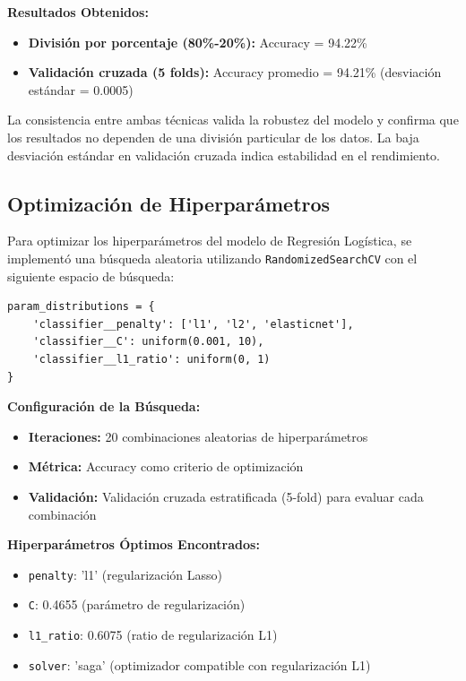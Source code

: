 \documentclass{article}
\begin{document}
\textbf{Resultados Obtenidos:}
\begin{itemize}
    \item \textbf{División por porcentaje (80\%-20\%):} Accuracy = 94.22\%
    \item \textbf{Validación cruzada (5 folds):} Accuracy promedio = 94.21\% (desviación estándar = 0.0005)
\end{itemize}

La consistencia entre ambas técnicas valida la robustez del modelo y confirma que los resultados no dependen de una división particular de los datos. La baja desviación estándar en validación cruzada indica estabilidad en el rendimiento.

\subsection{Optimización de Hiperparámetros}

Para optimizar los hiperparámetros del modelo de Regresión Logística, se implementó una búsqueda aleatoria utilizando \texttt{RandomizedSearchCV} con el siguiente espacio de búsqueda:

\begin{verbatim}
param_distributions = {
    'classifier__penalty': ['l1', 'l2', 'elasticnet'],
    'classifier__C': uniform(0.001, 10),
    'classifier__l1_ratio': uniform(0, 1)
}
\end{verbatim}

\textbf{Configuración de la Búsqueda:}
\begin{itemize}
    \item \textbf{Iteraciones:} 20 combinaciones aleatorias de hiperparámetros
    \item \textbf{Métrica:} Accuracy como criterio de optimización
    \item \textbf{Validación:} Validación cruzada estratificada (5-fold) para evaluar cada combinación
\end{itemize}

\textbf{Hiperparámetros Óptimos Encontrados:}
\begin{itemize}
    \item \texttt{penalty}: 'l1' (regularización Lasso)
    \item \texttt{C}: 0.4655 (parámetro de regularización)
    \item \texttt{l1\_ratio}: 0.6075 (ratio de regularización L1)
    \item \texttt{solver}: 'saga' (optimizador compatible con regularización L1)
\end{itemize}
\end{document}
